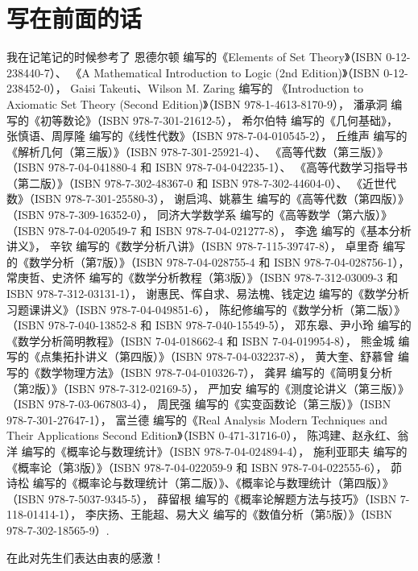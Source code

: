 \chapter*{写在前面的话}
我在记笔记的时候参考了
恩德尔顿 编写的《Elements of Set Theory》（ISBN 0-12-238440-7）、
《A Mathematical Introduction to Logic (2nd Edition)》（ISBN 0-12-238452-0），
Gaisi Takeuti、Wilson M. Zaring 编写的
《Introduction to Axiomatic Set Theory (Second Edition)》（ISBN 978-1-4613-8170-9），
潘承洞 编写的《初等数论》（ISBN 978-7-301-21612-5），
希尔伯特 编写的《几何基础》，
张慎语、周厚隆 编写的《线性代数》（ISBN 978-7-04-010545-2），
丘维声 编写的
《解析几何（第三版）》（ISBN 978-7-301-25921-4）、
《高等代数（第三版）》（ISBN 978-7-04-041880-4 和 ISBN 978-7-04-042235-1）、
《高等代数学习指导书（第二版）》（ISBN 978-7-302-48367-0 和 ISBN 978-7-302-44604-0）、
《近世代数》（ISBN 978-7-301-25580-3），
谢启鸿、姚慕生 编写的《高等代数（第四版）》（ISBN 978-7-309-16352-0），
同济大学数学系 编写的《高等数学（第六版）》（ISBN 978-7-04-020549-7 和 ISBN 978-7-04-021277-8），
李逸 编写的《基本分析讲义》，
辛钦 编写的《数学分析八讲》（ISBN 978-7-115-39747-8），
卓里奇 编写的《数学分析（第7版）》（ISBN 978-7-04-028755-4 和 ISBN 978-7-04-028756-1），
常庚哲、史济怀 编写的《数学分析教程（第3版）》（ISBN 978-7-312-03009-3 和 ISBN 978-7-312-03131-1），
谢惠民、恽自求、易法槐、钱定边 编写的《数学分析习题课讲义》（ISBN 978-7-04-049851-6），
陈纪修编写的《数学分析（第二版）》（ISBN 978-7-040-13852-8 和 ISBN 978-7-040-15549-5），
邓东皋、尹小玲 编写的《数学分析简明教程》（ISBN 7-04-018662-4 和 ISBN 7-04-019954-8），
熊金城 编写的《点集拓扑讲义（第四版）》（ISBN 978-7-04-032237-8），
黄大奎、舒慕曾 编写的《数学物理方法》（ISBN 978-7-04-010326-7），
龚昇 编写的《简明复分析（第2版）》（ISBN 978-7-312-02169-5），
严加安 编写的《测度论讲义（第三版）》（ISBN 978-7-03-067803-4），
周民强 编写的《实变函数论（第三版）》（ISBN 978-7-301-27647-1），
富兰德 编写的《Real Analysis Modern Techniques and Their Applications Second Edition》（ISBN 0-471-31716-0），
陈鸿建、赵永红、翁洋 编写的《概率论与数理统计》（ISBN 978-7-04-024894-4），
施利亚耶夫 编写的《概率论（第3版）》（ISBN 978-7-04-022059-9 和 ISBN 978-7-04-022555-6），
茆诗松 编写的《概率论与数理统计（第二版）》、《概率论与数理统计（第四版）》（ISBN 978-7-5037-9345-5），
薛留根 编写的《概率论解题方法与技巧》（ISBN 7-118-01414-1），
李庆扬、王能超、易大义 编写的《数值分析（第5版）》（ISBN 978-7-302-18565-9）.

在此对先生们表达由衷的感激！

